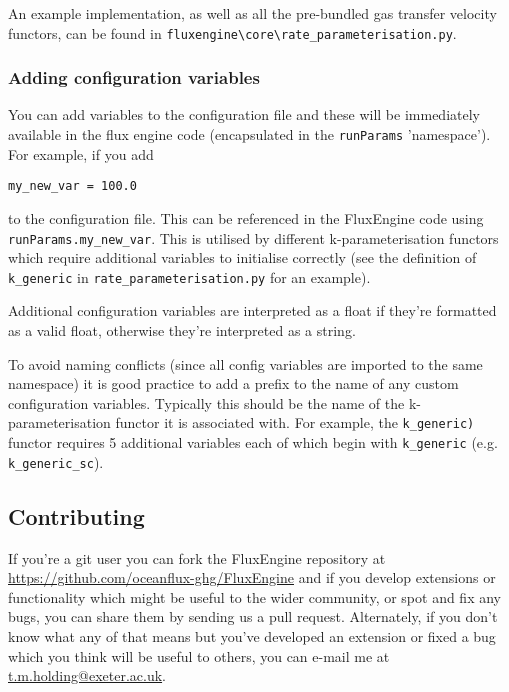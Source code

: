 \documentclass[]{scrartcl}
\begin{document}
An example implementation, as well as all the pre-bundled gas transfer velocity functors, can be found in \texttt{fluxengine{\textbackslash}core{\textbackslash}rate\_parameterisation.py}.


\subsubsection{Adding configuration variables}
You can add variables to the configuration file and these will be immediately available in the flux engine code (encapsulated in the \texttt{runParams} 'namespace'). For example, if you add
\begin{lstlisting}
my_new_var = 100.0
\end{lstlisting}
to the configuration file. This can be referenced in the FluxEngine code using \texttt{runParams.my\_new\_var}. This is utilised by different k-parameterisation functors which require additional variables to initialise correctly (see the definition of \texttt{k\_generic} in \texttt{rate\_parameterisation.py} for an example).

Additional configuration variables are interpreted as a float if they're formatted as a valid float, otherwise they're interpreted as a string.

To avoid naming conflicts (since all config variables are imported to the same namespace) it is good practice to add a prefix to the name of any custom configuration variables. Typically this should be the name of the k-parameterisation functor it is associated with. For example, the \texttt{k\_generic)} functor requires 5 additional variables each of which begin with \texttt{k\_generic} (e.g. \texttt{k\_generic\_sc}).

\subsection{Contributing}
If you're a git user you can fork the FluxEngine repository at \url{https://github.com/oceanflux-ghg/FluxEngine} and if you develop extensions or functionality which might be useful to the wider community, or spot and fix any bugs, you can share them by sending us a pull request. Alternately, if you don't know what any of that means but you've developed an extension or fixed a bug which you think will be useful to others, you can e-mail me at \url{t.m.holding@exeter.ac.uk}.
\end{document}
